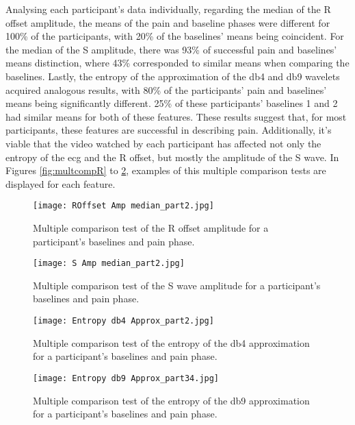 Analysing each participant's data individually, regarding the median of the R offset amplitude, the means of the pain and baseline phases were different for 100\% of the participants, with 20\% of the baselines' means being coincident. For the median of the S amplitude, there was 93\% of successful pain and baselines' means distinction, where 43\% corresponded to similar means when comparing the baselines.
Lastly, the entropy of the approximation of the db4 and db9 wavelets acquired analogous results, with 80\% of the participants' pain and baselines' means being significantly different. 25\% of these participants' baselines 1 and 2 had similar means for both of these features. These results suggest that, for most participants, these features are successful in describing pain. Additionally, it's viable that the video watched by each participant has affected not only the entropy of the \ac{ecg} and the R offset, but mostly the amplitude of the S wave. In Figures \ref{fig:multcompR} to \ref{fig:multcomp9}, examples of this multiple comparison tests are displayed for each feature. 



\begin{figure}[htbp]
    \centering
    \begin{minipage}{0.49\textwidth}
        \centering
        \texttt{[image: ROffset Amp median\_part2.jpg]}
        \caption{Multiple comparison test of the R offset amplitude for a participant's baselines and pain phase.}
        \label{fig:multcompR}
    \end{minipage}
    \hfill
    \begin{minipage}{0.49\textwidth}
        \centering
        \texttt{[image: S Amp median\_part2.jpg]}
        \caption{Multiple comparison test of the S wave amplitude for a participant's baselines and pain phase.}
        \label{fig:multcompS}
    \end{minipage}
\end{figure}



\begin{figure}[htbp]
    \centering
    \begin{minipage}{0.49\textwidth}
        \centering
        \texttt{[image: Entropy db4 Approx\_part2.jpg]}
        \caption{Multiple comparison test of the entropy of the db4 approximation for a participant's baselines and pain phase.}
        \label{fig:multcomp4}
    \end{minipage}
    \hfill
    \begin{minipage}{0.49\textwidth}
        \centering
        \texttt{[image: Entropy db9 Approx\_part34.jpg]}
        \caption{Multiple comparison test of the entropy of the db9 approximation for a participant's baselines and pain phase.}
        \label{fig:multcomp9}
    \end{minipage}
\end{figure}


